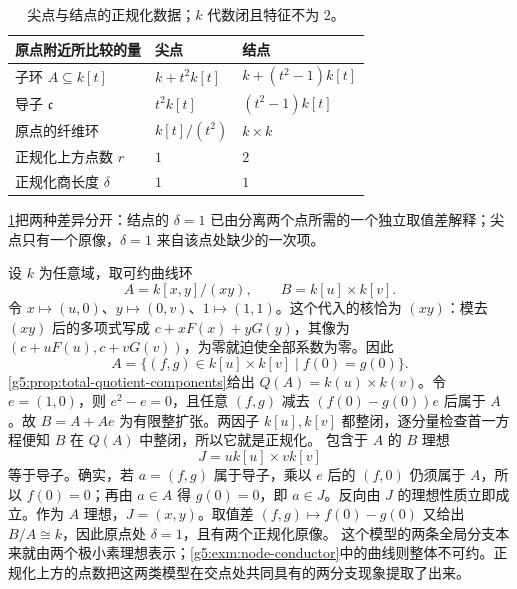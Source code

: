 \begin{table}[htbp]
	\centering
	\caption[尖点与结点的正规化数据]{尖点与结点的正规化数据；\(k\) 代数闭且特征不为 \(2\)。}
	\label{g5:tab:cusp-node-conductor}
	\begin{tabular}{lll}
	\toprule
	原点附近所比较的量 & 尖点 & 结点\\
	\midrule
	子环 \(A\subseteq k[t]\) & \(k+t^2k[t]\) & \(k+(t^2-1)k[t]\)\\
	导子 \(\mathfrak c\) & \(t^2k[t]\) & \((t^2-1)k[t]\)\\
	原点的纤维环 & \(k[t]/(t^2)\) & \(k\times k\)\\
	正规化上方点数 \(r\) & \(1\) & \(2\)\\
	正规化商长度 \(\delta\) & \(1\) & \(1\)\\
	\bottomrule
	\end{tabular}
\end{table}

\cref{g5:tab:cusp-node-conductor}把两种差异分开：结点的 \(\delta=1\) 已由分离两个点所需的一个独立取值差解释；尖点只有一个原像，\(\delta=1\) 来自该点处缺少的一次项。

\begin{example}\label{g5:exm:reducible-node-conductor}
	设 \(k\) 为任意域，取可约曲线环
	\[
	A=k[x,y]/(xy),\qquad B=k[u]\times k[v].
	\]
	令 \(x\mapsto(u,0)\)、\(y\mapsto(0,v)\)、\(1\mapsto(1,1)\)。这个代入的核恰为 \((xy)\)：模去 \((xy)\) 后的多项式写成 \(c+xF(x)+yG(y)\)，其像为 \((c+uF(u),c+vG(v))\)，为零就迫使全部系数为零。因此
	\[
	A=\{(f,g)\in k[u]\times k[v]\mid f(0)=g(0)\}.
	\]
	\cref{g5:prop:total-quotient-components}给出 \(Q(A)=k(u)\times k(v)\)。令 \(e=(1,0)\)，则 \(e^2-e=0\)，且任意 \((f,g)\) 减去 \((f(0)-g(0))e\) 后属于 \(A\)。故 \(B=A+Ae\) 为有限整扩张。两因子 \(k[u],k[v]\) 都整闭，逐分量检查首一方程便知 \(B\) 在 \(Q(A)\) 中整闭，所以它就是正规化。
	包含于 \(A\) 的 \(B\) 理想
	\[
	J=uk[u]\times vk[v]
	\]
	等于导子。确实，若 \(a=(f,g)\) 属于导子，乘以 \(e\) 后的 \((f,0)\) 仍须属于 \(A\)，所以 \(f(0)=0\)；再由 \(a\in A\) 得 \(g(0)=0\)，即 \(a\in J\)。反向由 \(J\) 的理想性质立即成立。作为 \(A\) 理想，\(J=(x,y)\)。取值差 \((f,g)\mapsto f(0)-g(0)\) 又给出 \(B/A\cong k\)，因此原点处 \(\delta=1\)，且有两个正规化原像。
	这个模型的两条全局分支本来就由两个极小素理想表示；\cref{g5:exm:node-conductor}中的曲线则整体不可约。正规化上方的点数把这两类模型在交点处共同具有的两分支现象提取了出来。
\end{example}
